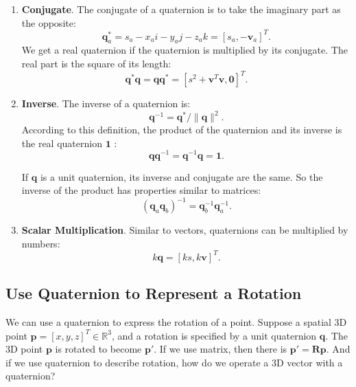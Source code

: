 \begin{enumerate}
    \item { \textbf {Conjugate}}. The conjugate of a quaternion is to take the imaginary part as the opposite:
    \begin{equation}
    \mathbf{q}_a ^ * = s_a - x_ai - y_aj - z_ak = [s_a, - \mathbf{v}_a] ^T.
    \end{equation}
    We get a real quaternion if the quaternion is multiplied by its conjugate. The real part is the square of its length:
    \begin{equation}
    \mathbf{q}^* \mathbf{q} = \mathbf{q} \mathbf{q}^* = [s^2+\mathbf{v}^T \mathbf{v}, \mathbf{0} ]^T.
    \end{equation}
    
    \item { \textbf{Inverse}}. The inverse of a quaternion is:
    \begin{equation}
    \label{eq:quaternionInverse}
    \mathbf{q} ^ { - 1 } = \mathbf{q} ^ * / \| \mathbf{q} \| ^ 2.
    \end{equation}
    According to this definition, the product of the quaternion and its inverse is the real quaternion $ \mathbf {1} $ :
    \begin{equation}
    \mathbf{q} \mathbf{q}^{-1} = \mathbf{q}^{-1} \mathbf{q} = \mathbf{1}.
    \end{equation}
    
    If $ \mathbf{q} $ is a unit quaternion, its inverse and conjugate are the same. So the inverse of the product has properties similar to matrices:
    \begin{equation}
    \left( \mathbf{q}_a \mathbf{q}_b \right)^{-1} = \mathbf{q}_b^{-1} \mathbf{q}_a^{-1}.
    \end{equation}
    
    \item { \textbf {Scalar Multiplication}.} Similar to vectors, quaternions can be multiplied by numbers:
    \begin{equation}
    k \mathbf{q} = \left[ ks, k\mathbf{v} \right]^T.
    \end{equation}
\end{enumerate}

\subsection{Use Quaternion to Represent a Rotation}

We can use a quaternion to express the rotation of a point. Suppose a spatial 3D point $ \mathbf{p} = [x,y,z]^T \in  \mathbb {R}^3$, and a rotation is specified by a unit quaternion $ \mathbf{q}$. The 3D point $\mathbf{p}$ is rotated to become $\mathbf{p}'$. If we use matrix, then there is $ \mathbf{p}'= \mathbf{R} \mathbf{p} $. And if we use quaternion to describe rotation, how do we operate a 3D vector with a quaternion?

